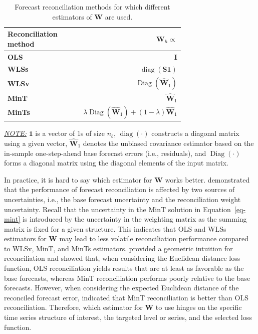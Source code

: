 \documentclass[
  12pt,
  11pt]{article}
\begin{document}
\begin{table}[!h]
\caption{Forecast reconciliation methods for which different estimators of $\bm{W}$ are used.}\label{tbl-bench}
\centering
\begin{threeparttable}
\begin{tabular}{p{0.7\linewidth}r}
\toprule
Reconciliation method & $\bm{W}_h \propto$\\
\midrule
\textbf{OLS} \citep{Hyndman2011-sd} & $\bm{I}$\\
\textbf{WLSs} \citep{Athanasopoulos2017-jj} & $\operatorname{diag}(\bm{S} \bm{1})$\\
\textbf{WLSv} \citep{Hyndman2016-cz} & $\operatorname{Diag}(\hat{\bm{W}}_1)$\\
\textbf{MinT} \citep{Wickramasuriya2019-fc} & $\hat{\bm{W}}_1$\\
\textbf{MinTs} \citep{Wickramasuriya2019-fc} & $\lambda\operatorname{Diag}(\hat{\bm{W}}_1) + (1-\lambda)\hat{\bm{W}}_1$\\
\bottomrule
\end{tabular}
\begin{tablenotes}[para]
\linespread{1}\small
\footnotesize
\underline{\textit{NOTE:}}
$\bm{1}$ is a vector of 1s of size $n_b$, $\operatorname{diag}(\cdot)$ constructs a diagonal matrix using a given vector, $\hat{\bm{W}}_1$ denotes the unbiased covariance estimator based on the in-sample one-step-ahead base forecast errors (i.e., residuals), and $\operatorname{Diag}(\cdot)$ forms a diagonal matrix using the diagonal elements of the input matrix.
\end{tablenotes}
\end{threeparttable}
\end{table}

In practice, it is hard to say which estimator for \(\bm{W}\) works
better. \citet{Pritularga2021-lz} demonstrated that the performance of
forecast reconciliation is affected by two sources of uncertainties,
i.e., the base forecast uncertainty and the reconciliation weight
uncertainty. Recall that the uncertainty in the MinT solution in
Equation~\ref{eq-mint} is introduced by the uncertainty in the weighting
matrix as the summing matrix is fixed for a given structure. This
indicates that OLS and WLSs estimators for \(\bm{W}\) may lead to less
volatile reconciliation performance compared to WLSv, MinT, and MinTs
estimators. \citet{Panagiotelis2021-mf} provided a geometric intuition
for reconciliation and showed that, when considering the Euclidean
distance loss function, OLS reconciliation yields results that are at
least as favorable as the base forecasts, whereas MinT reconciliation
performs poorly relative to the base forecasts. However, when
considering the expected Euclidean distance of the reconciled forecast
error, \citet{Wickramasuriya2021-am} indicated that MinT reconciliation
is better than OLS reconciliation. Therefore, which estimator for
\(\bm{W}\) to use hinges on the specific time series structure of
interest, the targeted level or series, and the selected loss function.
\end{document}
